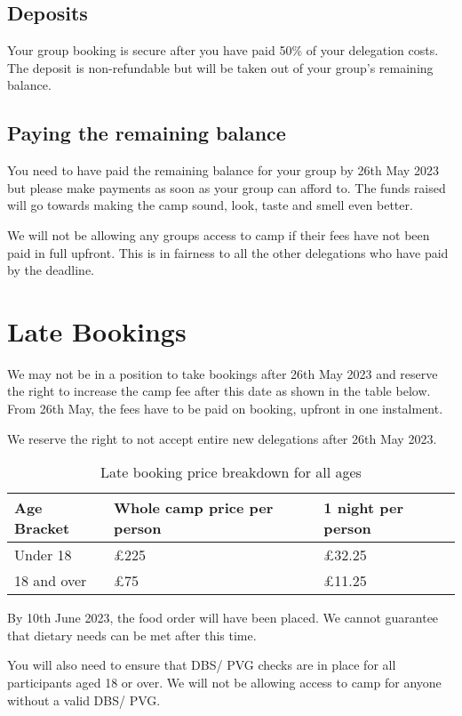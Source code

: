 \subsection{Deposits}
Your group booking is secure after you have paid 50\% of your delegation costs. The deposit is non-refundable but will be taken out of your group's remaining balance.

\subsection{Paying the remaining balance}
You need to have paid the remaining balance for your group by 26th May 2023 but please make payments as soon as your group can afford to. The funds raised will go towards making the camp sound, look, taste and smell even better.

We will not be allowing any groups access to camp if their fees have not been paid in full upfront. This is in fairness to all the other delegations who have paid by the deadline.

\section{Late Bookings}
We may not be in a position to take bookings after 26th May 2023 and reserve the right to increase the camp fee after this date as shown in the table below. From 26th May, the fees have to be paid on booking, upfront in one instalment.

We reserve the right to not accept entire new delegations after 26th May 2023.
\begin{table}[H]
    \centering   
    \begin{tabularx}{0.9\textwidth}{XXX}
        \textbf{Age Bracket} & \textbf{Whole camp price per person} & \textbf{1 night per person} \\
        \hline
        \hline
        Under 18 & £225 & £32.25\\
        \hline
        18 and over & £75 & £11.25\\
        \hline
    \end{tabularx}
    \caption{Late booking price breakdown for all ages}
\end{table}

By 10th June 2023, the food order will have been placed. We cannot guarantee that dietary needs can be met after this time.

You will also need to ensure that DBS/ PVG checks are in place for all participants aged 18 or over. We will not be allowing access to camp for anyone without a valid DBS/ PVG.

